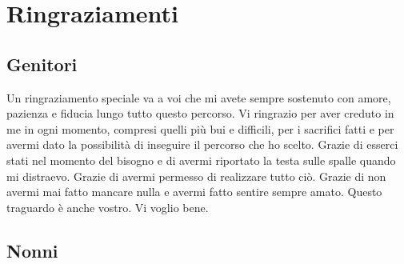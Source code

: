 \documentclass[12pt,a4paper,twoside]{report}
\begin{document}
\clearpage
{}
{}
\nocite{*}



\clearpage
{}
{}
\chapter*{Ringraziamenti}

\section*{Genitori}

Un ringraziamento speciale va a voi che mi avete sempre sostenuto con amore, pazienza e fiducia lungo tutto questo percorso. 
\newline Vi ringrazio per aver creduto in me in ogni momento, compresi quelli più bui e difficili, per i sacrifici fatti e per avermi dato la possibilità di inseguire il percorso che ho scelto. 
\newline Grazie di esserci stati nel momento del bisogno e di avermi riportato la testa sulle spalle quando mi distraevo. 
\newline Grazie di avermi permesso di realizzare tutto ciò. 
\newline Grazie di non avermi mai fatto mancare nulla e avermi fatto sentire sempre amato.
\newline Questo traguardo è anche vostro.
\newline Vi voglio bene. 

\clearpage
\section*{Nonni}
\end{document}
